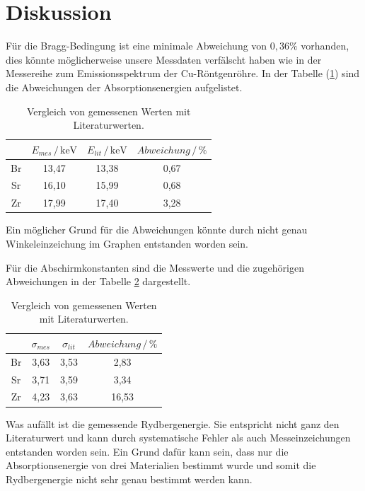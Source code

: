\section{Diskussion}
Für die Bragg-Bedingung ist eine minimale Abweichung von $0,36\%$ vorhanden, dies könnte möglicherweise
unsere Messdaten verfälscht haben wie in der Messereihe zum Emissionsspektrum der Cu-Röntgenröhre.
In der Tabelle (\ref{tab:3}) sind die Abweichungen der Absorptionsenergien aufgelistet.
\begin{table}
  \centering
  \caption{Vergleich von gemessenen Werten mit Literaturwerten.}
  \label{tab:3}
  \begin{tabular}{c c c c}
    \toprule
     & $E_{mes}\,/ \, \text{keV}$  & $E_{lit}\,/ \, \text{keV}$ & $Abweichung \,/\,\%$ \\
    \midrule
    Br & 13,47 & 13,38 & 0,67\\
    Sr & 16,10 & 15,99 & 0,68\\
    Zr & 17,99 & 17,40 & 3,28\\
    \bottomrule
  \end{tabular}
\end{table}
Ein möglicher Grund für die Abweichungen könnte durch nicht genau Winkeleinzeichung im Graphen entstanden worden sein.

Für die Abschirmkonstanten sind die Messwerte und die zugehörigen Abweichungen in der Tabelle
\ref{tab:4} dargestellt.

\begin{table}[H]
  \centering
  \caption{Vergleich von gemessenen Werten mit Literaturwerten.}
  \label{tab:4}
  \begin{tabular}{c c c c}
    \toprule
     & $\sigma_{mes}$  & $\sigma_{lit}$ & $Abweichung \,/\,\%$ \\
    \midrule
    Br & 3,63 & 3,53 & 2,83\\
    Sr & 3,71 & 3,59 & 3,34\\
    Zr & 4,23 & 3,63 & 16,53\\
    \bottomrule
  \end{tabular}
\end{table}

Was aufällt ist die gemessende Rydbergenergie. Sie entspricht nicht ganz den Literaturwert und kann durch systematische Fehler
als auch Messeinzeichungen entstanden worden sein. Ein Grund dafür kann sein, dass
nur die Absorptionsenergie von drei Materialien bestimmt wurde und somit die Rydbergenergie
nicht sehr genau bestimmt werden kann.

